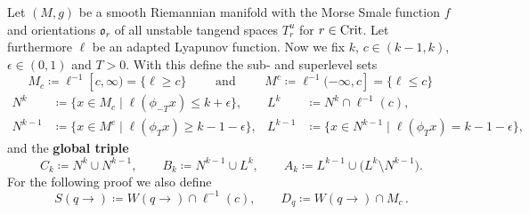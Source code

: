 \begin{definition}\label{def:morseFilt-globalSetup}
	Let $(M,g)$ be a smooth Riemannian manifold with the Morse Smale function $f$ and orientations $\mathfrak{o}_r$ of all unstable tangend spaces $T^u_r$ for $r\in \mathrm{Crit}$. Let furthermore $\ell$ be an adapted Lyapunov function. Now we fix $k$, $c\in (k-1,k)$, $\epsilon \in (0,1)$ and $T>0$. With this define the sub- and superlevel sets 
	\begin{equation*}
		M_c\coloneq \ell^{-1}[c,\infty)=\{\ell \geq c\}\qquad \text{ and }\qquad M^c\coloneq \ell^{-1}(-\infty,c]=\{\ell \leq c\}\,
	\end{equation*} 
	\begin{align*}
		N^k
		&\coloneq \{x\in M_c \mid \ell(\phi_{-T}x)\le k+\epsilon\}, &
		L^k
		&\coloneq N^k\cap\ell^{-1}(c),\\
		N^{k-1} &\coloneq \{x\in M^c \mid \ell(\phi_{T}x)\ge k-1-\epsilon\}, &
		L^{k-1} &\coloneq \{x\in N^{k-1}\mid \ell(\phi_T x)=k-1-\epsilon\},
	\end{align*}and the \textbf{global triple}
	\begin{equation*}
		C_k\coloneq N^k\cup N^{k-1},\qquad
		B_k\coloneq N^{k-1}\cup L^k,\qquad
		A_k\coloneq L^{k-1}\cup\big(L^k\setminus N^{k-1}\big).
	\end{equation*}
	For the following proof we also define 
	\begin{equation*}
		S(q\to) \coloneq W(q\to)\cap \ell^{-1}(c),\qquad
		D_q \coloneq W(q\to)\cap M_c\,.
	\end{equation*}
\end{definition}


